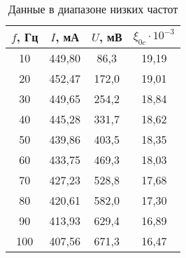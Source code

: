 \begin{table}[]
    \centering
    \begin{tabular}{|c|c|c|c|}
    \hline
    $f$, Гц & $I$, мА & $U$, мВ  & $\xi_{0c} \cdot 10^{-3}$ \\ \hline
    10      & 449,80  & 86,3     & 19,19                    \\ \hline
    20      & 452,47  & 172,0    & 19,01                    \\ \hline
    30      & 449,65  & 254,2    & 18,84                    \\ \hline
    40      & 445,28  & 331,7    & 18,62                    \\ \hline
    50      & 439,86  & 403,5    & 18,35                    \\ \hline
    60      & 433,75  & 469,3    & 18,03                    \\ \hline
    70      & 427,23  & 528,8    & 17,68                    \\ \hline
    80      & 420,61  & 582,0    & 17,30                    \\ \hline
    90      & 413,93  & 629,4    & 16,89                    \\ \hline
    100     & 407,56  & 671,3    & 16,47                    \\ \hline
    \end{tabular}
    \caption{Данные в диапазоне низких частот}
    \label{table_low_f}
\end{table}